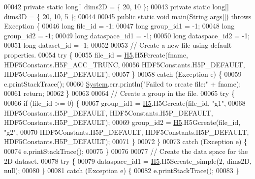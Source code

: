 \begin{DoxyCode}
00042     \textcolor{keyword}{private} \textcolor{keyword}{static} \textcolor{keywordtype}{long}[] dims2D = \{ 20, 10 \};
00043     \textcolor{keyword}{private} \textcolor{keyword}{static} \textcolor{keywordtype}{long}[] dims3D = \{ 20, 10, 5 \};
00044 
00045     \textcolor{keyword}{public} \textcolor{keyword}{static} \textcolor{keywordtype}{void} main(String args[]) \textcolor{keywordflow}{throws} Exception \{
00046         \textcolor{keywordtype}{long} file\_id = -1;
00047         \textcolor{keywordtype}{long} group\_id1 = -1;
00048         \textcolor{keywordtype}{long} group\_id2 = -1;
00049         \textcolor{keywordtype}{long} dataspace\_id1 = -1;
00050         \textcolor{keywordtype}{long} dataspace\_id2 = -1;
00051         \textcolor{keywordtype}{long} dataset\_id = -1;
00052 
00053         \textcolor{comment}{// Create a new file using default properties.}
00054         \textcolor{keywordflow}{try} \{
00055             file\_id = \hyperlink{namespace_h5}{H5}.H5Fcreate(fname, HDF5Constants.H5F\_ACC\_TRUNC,
00056                     HDF5Constants.H5P\_DEFAULT, HDF5Constants.H5P\_DEFAULT);
00057         \}
00058         \textcolor{keywordflow}{catch} (Exception e) \{
00059             e.printStackTrace();
00060             \hyperlink{namespace_system}{System}.err.println(\textcolor{stringliteral}{"Failed to create file:"} + fname);
00061             \textcolor{keywordflow}{return};
00062         \}
00063 
00064         \textcolor{comment}{// Create a group in the file.}
00065         \textcolor{keywordflow}{try} \{
00066             \textcolor{keywordflow}{if} (file\_id >= 0) \{
00067                 group\_id1 = \hyperlink{namespace_h5}{H5}.H5Gcreate(file\_id, \textcolor{stringliteral}{"g1"},
00068                         HDF5Constants.H5P\_DEFAULT, HDF5Constants.H5P\_DEFAULT, HDF5Constants.H5P\_DEFAULT);
00069                 group\_id2 = \hyperlink{namespace_h5}{H5}.H5Gcreate(file\_id, \textcolor{stringliteral}{"g2"},
00070                         HDF5Constants.H5P\_DEFAULT, HDF5Constants.H5P\_DEFAULT, HDF5Constants.H5P\_DEFAULT);
00071             \}
00072         \}
00073         \textcolor{keywordflow}{catch} (Exception e) \{
00074             e.printStackTrace();
00075         \}
00076 
00077         \textcolor{comment}{// Create the data space for the  2D dataset.}
00078         \textcolor{keywordflow}{try} \{
00079             dataspace\_id1 = \hyperlink{namespace_h5}{H5}.H5Screate\_simple(2, dims2D, null);
00080         \}
00081         \textcolor{keywordflow}{catch} (Exception e) \{
00082             e.printStackTrace();
00083         \}

\end{DoxyCode}
